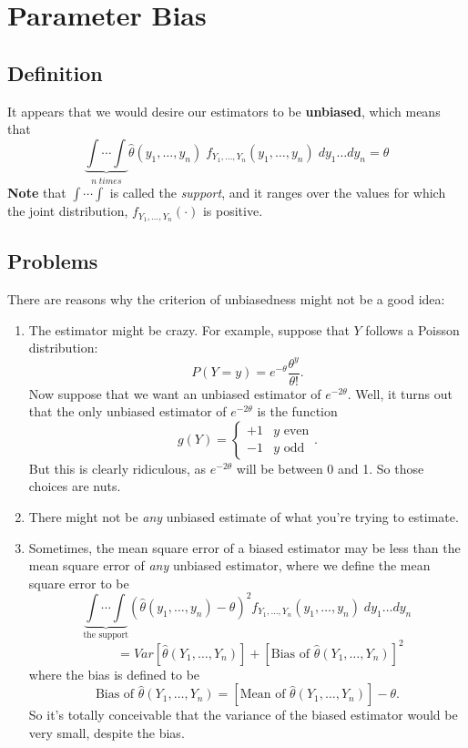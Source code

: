\documentclass[a4paper,12pt]{scrartcl}
\begin{document}
\section{Parameter Bias}

\subsection{Definition}

It appears that we would desire our estimators to be \textbf{unbiased},
which means that
   \[ \underbrace{\int \cdots \int}_{n\; times}
      \hat{\theta}(y_1,\ldots,y_n) \;
      f_{Y_1,\ldots,Y_n}(y_1,\ldots,y_n) \; dy_1 \ldots dy_n = \theta \]
\textbf{Note} that $\int \cdots \int$ is called the \emph{support},
and it ranges over the values for which the joint distribution,
$f_{Y_1,\ldots,Y_n}(\cdot)$ is positive.

\subsection{Problems}

There are reasons why the criterion of unbiasedness might not be a good
idea:
\begin{enumerate}
   \item{The estimator might be crazy.  For example, suppose that $Y$
      follows a Poisson distribution:
	 \[ P(Y=y) = e^{-\theta} \frac{\theta^y}{\theta!}.\]
      Now suppose that we want an unbiased estimator of $e^{-2\theta}$.
      Well, it turns out that the only unbiased estimator of
      $e^{-2\theta}$ is the function
	 \[ g(Y) = \begin{cases} +1 & \text{$y$ even} \\
	       -1 & \text{$y$ odd} \end{cases}.\]
      But this is clearly ridiculous, as $e^{-2\theta}$ will be between
      0 and 1. So those choices are nuts.
      }
   \item{There might not be \emph{any} unbiased estimate of what you're
      trying to estimate.}
   \item{Sometimes, the mean square error of a biased estimator may be
      less than the mean square error of \emph{any} unbiased
      estimator, where we define the mean square error to be
      \[ \underbrace{\int \cdots \int}_{\text{the support}}
	 \left( \hat{\theta}(y_1, \ldots, y_n) - \theta\right)^2
	 f_{Y_1,\ldots, Y_n}(y_1,\ldots,y_n)\; dy_1\ldots dy_n \]
      \[\qquad = Var\left[\hat{\theta}(Y_1,\ldots,Y_n)\right]
	 + [\text{Bias of } \hat{\theta}(Y_1,\ldots,Y_n)]^2 \]
      where the bias is defined to be
      \[ \text{Bias of } \hat{\theta}(Y_1,\ldots,Y_n) =
	 [\text{Mean of } \hat{\theta}(Y_1,\ldots,Y_n)] - \theta.\]
      So it's totally conceivable that the variance of the biased
      estimator would be very small, despite the bias.
   }
\end{enumerate}
\end{document}
